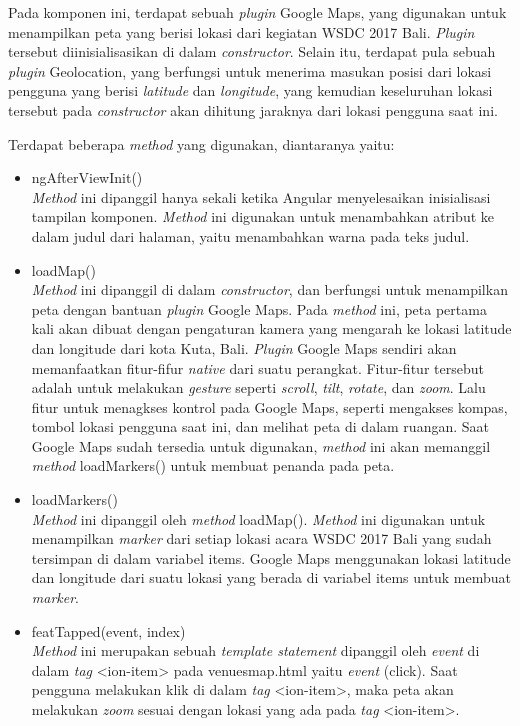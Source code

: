 \begin{itemize}
	Pada komponen ini, terdapat sebuah \textit{plugin} Google Maps, yang digunakan untuk menampilkan peta yang berisi lokasi dari kegiatan WSDC 2017 Bali. \textit{Plugin} tersebut diinisialisasikan di dalam \textit{constructor}. Selain itu, terdapat pula sebuah \textit{plugin} Geolocation, yang berfungsi untuk menerima masukan posisi dari lokasi pengguna yang berisi \textit{latitude} dan \textit{longitude}, yang kemudian keseluruhan lokasi tersebut pada \textit{constructor} akan dihitung jaraknya dari lokasi pengguna saat ini. 
	
	Terdapat beberapa \textit{method} yang digunakan, diantaranya yaitu:
	
	\begin{itemize}
		\item ngAfterViewInit()\\
		\textit{Method} ini dipanggil hanya sekali ketika Angular menyelesaikan inisialisasi tampilan komponen. \textit{Method} ini digunakan untuk menambahkan atribut ke dalam judul dari halaman, yaitu menambahkan warna pada teks judul.
		\item loadMap() \\
		\textit{Method} ini dipanggil di dalam \textit{constructor}, dan berfungsi untuk menampilkan peta dengan bantuan \textit{plugin} Google Maps. Pada \textit{method} ini, peta pertama kali akan dibuat dengan pengaturan kamera yang mengarah ke lokasi latitude dan longitude dari kota Kuta, Bali. 	
		\textit{Plugin} Google Maps sendiri akan memanfaatkan fitur-fifur \textit{native} dari suatu perangkat. Fitur-fitur tersebut adalah untuk melakukan \textit{gesture} seperti \textit{scroll}, \textit{tilt}, \textit{rotate}, dan \textit{zoom}. Lalu fitur untuk menagkses kontrol pada Google Maps, seperti mengakses kompas, tombol lokasi pengguna saat ini, dan melihat peta di dalam ruangan. Saat Google Maps sudah tersedia untuk digunakan, \textit{method} ini akan memanggil \textit{method} loadMarkers() untuk membuat penanda pada peta.	
		\item loadMarkers() \\
		\textit{Method} ini dipanggil oleh \textit{method} loadMap(). \textit{Method} ini digunakan untuk menampilkan \textit{marker} dari setiap lokasi acara WSDC 2017 Bali yang sudah tersimpan di dalam variabel items. Google Maps menggunakan lokasi latitude dan longitude dari suatu lokasi yang berada di variabel items untuk membuat \textit{marker}.  
		\item featTapped(event, index) \\
		\textit{Method} ini merupakan sebuah \textit{template statement} dipanggil oleh \textit{event} di dalam \textit{tag} <ion-item> pada venues\textunderscore map.html yaitu \textit{event} (click). Saat pengguna melakukan klik di dalam \textit{tag} <ion-item>, maka peta akan melakukan \textit{zoom} sesuai dengan lokasi yang ada pada \textit{tag} <ion-item>.

\end{itemize}
\end{itemize}
